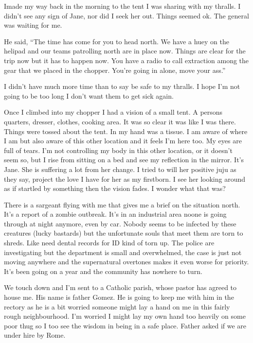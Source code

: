 \lettrine[lines=2,lraise=0]{I}\space made my way back in the morning to the tent I was sharing with my thralls. I didn't see any sign of Jane, nor did I seek her out. Things seemed ok. The general was waiting for me.

He said, ``The time has come for you to head north. We have a huey on the helipad and our teams patrolling north are in place now. Things are clear for the trip now but it has to happen now. You have a radio to call extraction among the gear that we placed in the chopper. You're going in alone, move your ass.''

I didn't have much more time than to say be safe to my thralls. I hope I'm not going to be too long I don't want them to get sick again.

Once I climbed into my chopper I had a vision of a small tent. A persons quarters, dresser, clothes, cooking area. It was so clear it was like I was there. Things were tossed about the tent. In my hand was a tissue. I am aware of where I am but also aware of this other location and it feels I'm here too. My eyes are full of tears. I'm not controlling my body in this other location, or it doesn't seem so, but I rise from sitting on a bed and see my reflection in the mirror. It's Jane. She is suffering a lot from her change. I tried to will her positive juju as they say, project the love I have for her as my firstborn. I see her looking around as if startled by something then the vision fades. I wonder what that was?

There is a sargeant flying with me that gives me a brief on the situation north. It's a report of a zombie outbreak. It's in an industrial area noone is going through at night anymore, even by car. Nobody seems to be infected by these creatures (lucky bastards) but the unfortunate souls that meet them are torn to shreds. Like need dental records for ID kind of torn up. The police are investigating but the department is small and overwhelmed, the case is just not moving anywhere and the supernatural overtones makes it even worse for priority. It's been going on a year and the community has nowhere to turn.

\parasep

We touch down and I'm sent to a Catholic parish, whose pastor has agreed to house me. His name is father Gomez. He is going to keep me with him in the rectory as he is a bit worried someone might lay a hand on me in this fairly rough neighbourhood. I'm worried I might lay my own hand too heavily on some poor thug so I too see the wisdom in being in a safe place. Father asked if we are under hire by Rome. 

